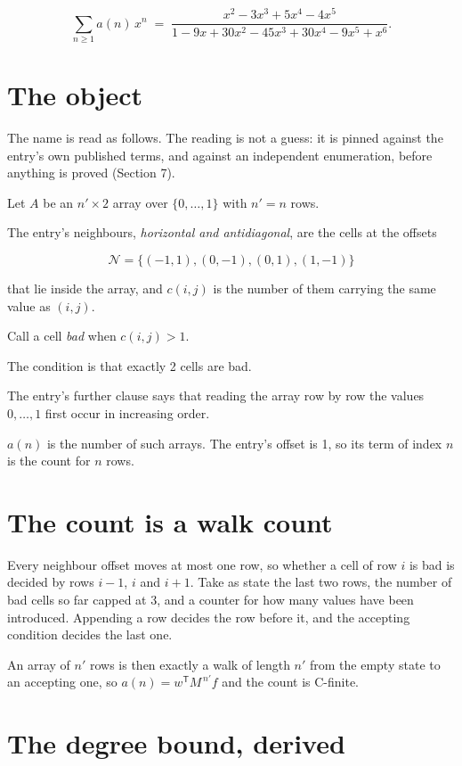 \documentclass[11pt]{article}
\theoremstyle{definition}
\begin{document}
\[\sum_{n \ge 1} a(n)\,x^n \;=\; \frac{x^{2} - 3x^{3} + 5x^{4} - 4x^{5}}{1 - 9x + 30x^{2} - 45x^{3} + 30x^{4} - 9x^{5} + x^{6}}.\]

\section{The object}

The name is read as follows. The reading is not a guess: it is pinned against the entry's own published terms, and against an independent enumeration, before anything is proved (Section 7).

Let $A$ be an $n' \times 2$ array over $\{0,\dots,1\}$ with $n' = n$ rows.

The entry's neighbours, {\itshape horizontal and antidiagonal}, are the cells at the offsets

\[\mathcal{N} = \{(-1,1), (0,-1), (0,1), (1,-1)\}\]

that lie inside the array, and $c(i,j)$ is the number of them carrying the same value as $(i,j)$.

Call a cell {\itshape bad} when $c(i,j) > 1$.

The condition is that exactly 2 cells are bad.

The entry's further clause says that reading the array row by row the values $0,\dots,1$ first occur in increasing order.

$a(n)$ is the number of such arrays. The entry's offset is 1, so its term of index $n$ is the count for $n$ rows.

\section{The count is a walk count}

Every neighbour offset moves at most one row, so whether a cell of row $i$ is bad is decided by rows $i-1$, $i$ and $i+1$. Take as state the last two rows, the number of bad cells so far capped at 3, and a counter for how many values have been introduced. Appending a row decides the row before it, and the accepting condition decides the last one.

An array of $n'$ rows is then exactly a walk of length $n'$ from the empty state to an accepting one, so $a(n) = w^{\mathsf T}M^{\,n'}f$ and the count is C-finite.

\section{The degree bound, derived}
\end{document}
